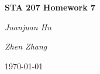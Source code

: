 \documentclass[12pt,a4paper]{report}
\begin{document}
\begin{titlepage}
	\centering
	{\huge\bfseries STA 207 Homework 7\par}
	\vspace{2cm}
	{\Large\itshape Juanjuan Hu\par}
	\vspace{1cm}
	{\Large\itshape Zhen Zhang\par}
	\vfill

	\vfill
	{\large \today\par}
\end{titlepage}
\end{document}
